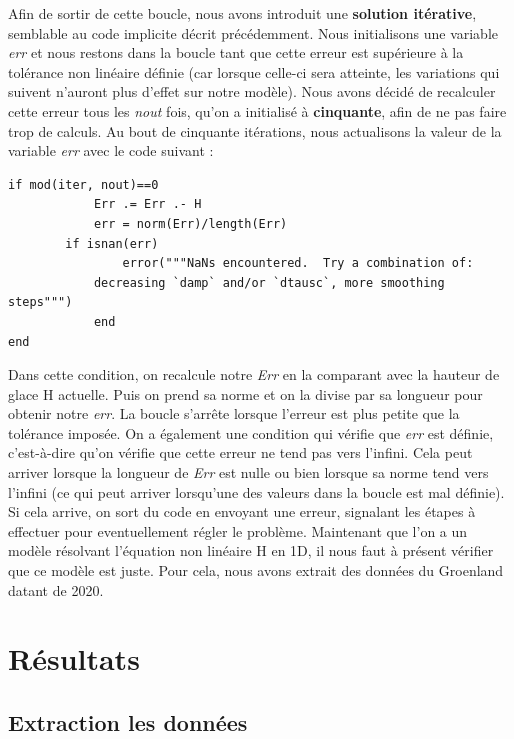 \documentclass{article}
\begin{document}
\newpage
Afin de sortir de cette boucle, nous avons introduit une \textbf{solution itérative}, semblable au code implicite décrit précédemment. Nous initialisons une variable \textit{err} et nous restons dans la boucle tant que cette erreur est supérieure à la tolérance non linéaire définie (car lorsque celle-ci sera atteinte, les variations qui suivent n'auront plus d'effet sur notre modèle). Nous avons décidé de recalculer cette erreur tous les \textit{nout} fois, qu'on a initialisé à \textbf{cinquante}, afin de ne pas faire trop de calculs. Au bout de cinquante itérations, nous actualisons la valeur de la variable \textit{err} avec le code suivant :
\begin{verbatim}
if mod(iter, nout)==0 
            Err .= Err .- H
            err = norm(Err)/length(Err) 
	    if isnan(err)
            	error("""NaNs encountered.  Try a combination of:
            decreasing `damp` and/or `dtausc`, more smoothing steps""")
            end
end
\end{verbatim}
Dans cette condition, on recalcule notre \textit{Err} en la comparant avec la hauteur de glace H actuelle. Puis on prend sa norme et on la divise par sa longueur pour obtenir notre \textit{err}. 
La boucle s'arrête lorsque l'erreur est plus petite que la tolérance imposée.
\newline
On a également une condition qui vérifie que \textit{err} est définie, c'est-à-dire qu'on vérifie que cette erreur ne tend pas vers l'infini. Cela peut arriver lorsque la longueur de \textit{Err} est nulle ou bien lorsque sa norme tend vers l'infini (ce qui peut arriver lorsqu'une des valeurs dans la boucle est mal définie). Si cela arrive, on sort du code en envoyant une erreur, signalant les étapes à effectuer pour eventuellement régler le problème.
\newline\newline
Maintenant que l'on a un modèle résolvant l'équation non linéaire H en 1D, il nous faut à présent vérifier que ce modèle est juste. Pour cela, nous avons extrait des données du Groenland datant de 2020.
\newpage

\section{Résultats}

\subsection{Extraction les données}
\end{document}
